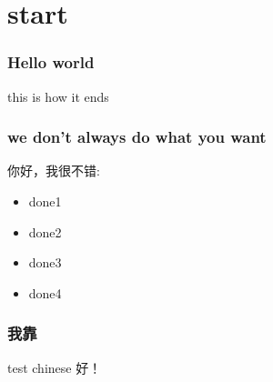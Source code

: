 \documentclass[xcolor=x11names,compress]{beamer}
\begin{document}
\maketitle
\section{start}
\begin{frame}
\frametitle{Hello world}
this is how it ends
\end{frame}

\begin{frame}
\frametitle{we don't always do what you want}
你好，我很不错:
\begin{itemize}
    \item done1
    \item done2
    \item done3
    \item done4
\end{itemize}
\end{frame}
\begin{frame}
\frametitle{我靠}
\begin{block}{test chinese}
好！
\end{block}
\end{frame}
\end{document}
